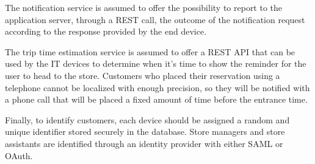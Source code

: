 \documentclass[../../main.tex]{subfiles}
\begin{document}
    The notification service is assumed to offer the possibility to report to the application server, through a REST call, the outcome of the notification request according to the response provided by the end device.

    The trip time estimation service is assumed to offer a REST API that can be used by the IT devices to determine when it's time to show the reminder for the user to head to the store. Customers who placed their reservation using a telephone cannot be localized with enough precision, so they will be notified with a phone call that will be placed a fixed amount of time before the entrance time.

    Finally, to identify customers, each device should be assigned a random and unique identifier stored securely in the database. Store managers and store assistants are identified through
    an identity provider with either SAML or OAuth. 
\end{document}
